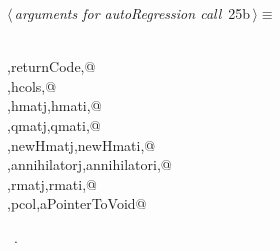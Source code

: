 \documentclass{article}
\begin{document}
\begin{flushleft} \small
\begin{minipage}{\linewidth}\label{scrap24}\raggedright\small
{} $\langle\,${\itshape arguments for autoRegression call}\nobreak\ {\footnotesize {25b}}$\,\rangle\equiv$
\vspace{-1ex}
\begin{list}{}{} \item
\mbox{}\verb@@\\
\mbox{}\verb@maxNumberOfHElements,returnCode,@\\
\mbox{}\verb@hrows,hcols,@\\
\mbox{}\verb@hmat,hmatj,hmati,@\\
\mbox{}\verb@qmat,qmatj,qmati,@\\
\mbox{}\verb@newHmat,newHmatj,newHmati,@\\
\mbox{}\verb@annihilator,annihilatorj,annihilatori,@\\
\mbox{}\verb@rmat,rmatj,rmati,@\\
\mbox{}\verb@prow,pcol,aPointerToVoid@\\
\mbox{}\verb@@{\NWsep}
\end{list}
\vspace{-1.5ex}
\footnotesize
\begin{list}{}{\setlength{\itemsep}{-\parsep}\setlength{\itemindent}{-\leftmargin}}
\item \NWtxtMacroRefIn\ .

\end{list}
\end{minipage}
\end{flushleft}
\end{document}
